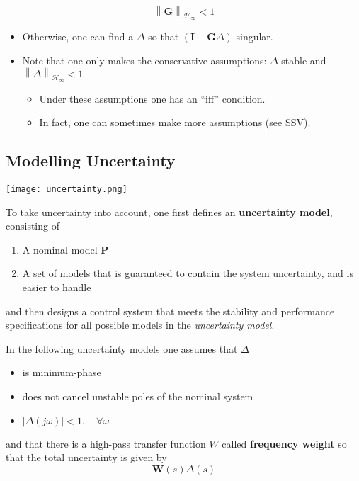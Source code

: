 \begin{equation*}
    {\left\|\mathbf{G}\right\|}_{\mathcal{H}_{\infty}}<1
\end{equation*}
\begin{itemize}
    \item Otherwise, one can find a $\Delta$ so that $(\mathbf{I}-\mathbf{G}\Delta)$ singular.
    \item Note that one only makes the conservative assumptions: $\Delta$ stable and $\left\|\Delta\right\|_{\mathcal{H}_\infty}<1$
          \begin{itemize}
              \item Under these assumptions one has an ``iff'' condition.
              \item In fact, one can sometimes make more assumptions (see SSV).
          \end{itemize}
\end{itemize}

\subsection{Modelling Uncertainty}
\begin{center}
    \texttt{[image: uncertainty.png]}
\end{center}
To take uncertainty into account, one first defines an \textbf{uncertainty model}, consisting of
\begin{enumerate}
    \item A nominal model $\mathbf{P}$
    \item A set of models that is guaranteed to contain the system uncertainty, and is easier to handle
\end{enumerate}
and then designs a control system that meets the stability and performance specifications for all possible models in the \textit{uncertainty model}.

\newpar{}

In the following uncertainty models one assumes that $\Delta$
\begin{itemize}
    \item is minimum-phase
    \item does not cancel unstable poles of the nominal system
    \item $|\Delta(j\omega)|<1,\quad\forall\omega$
\end{itemize}
and that there is a high-pass transfer function $W$ called \textbf{frequency weight} so that the total uncertainty is given by
\begin{equation*}
    \mathbf{W}(s)\Delta(s)
\end{equation*}

